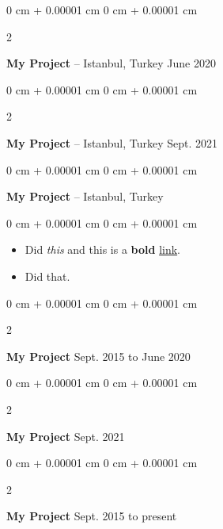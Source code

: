 \documentclass[10pt, letterpaper]{article}
\newenvironment{highlights}{
    \begin{itemize}[
        topsep=0.10 cm,
        parsep=0.10 cm,
        partopsep=0pt,
        itemsep=0pt,
        leftmargin=0 cm + 10pt
    ]
}{
    \end{itemize}
} %
\newenvironment{onecolentry}{
    \begin{adjustwidth}{
        0 cm + 0.00001 cm
    }{
        0 cm + 0.00001 cm
    }
}{
    \end{adjustwidth}
} %
\newenvironment{twocolentry}[2][]{
    \onecolentry
    \def\secondColumn{#2}
    \setcolumnwidth{\fill, 4.5 cm}
    \begin{paracol}{2}
}{
    \switchcolumn \raggedleft \secondColumn
    \end{paracol}
    \endonecolentry
} %
\begin{document}
        \vspace{0.2 cm}

        \begin{twocolentry}{
            June 2020
        }
            \textbf{My Project} -- Istanbul, Turkey\end{twocolentry}



        \vspace{0.2 cm}

        \begin{twocolentry}{
            Sept. 2021
        }
            \textbf{My Project} -- Istanbul, Turkey\end{twocolentry}



        \vspace{0.2 cm}

        \begin{onecolentry}
            \textbf{My Project} -- Istanbul, Turkey\end{onecolentry}

        \vspace{0.10 cm}
        \begin{onecolentry}
            \begin{highlights}
                \item Did \textit{this} and this is a \textbf{bold} \href{https://example.com}{link}.
                \item Did that.
            \end{highlights}
        \end{onecolentry}


        \vspace{0.2 cm}

        \begin{twocolentry}{
            Sept. 2015 to June 2020
        }
            \textbf{My Project}\end{twocolentry}



        \vspace{0.2 cm}

        \begin{twocolentry}{
            Sept. 2021
        }
            \textbf{My Project}\end{twocolentry}



        \vspace{0.2 cm}

        \begin{twocolentry}{
            Sept. 2015 to present
        }
            \textbf{My Project}\end{twocolentry}
\end{document}
